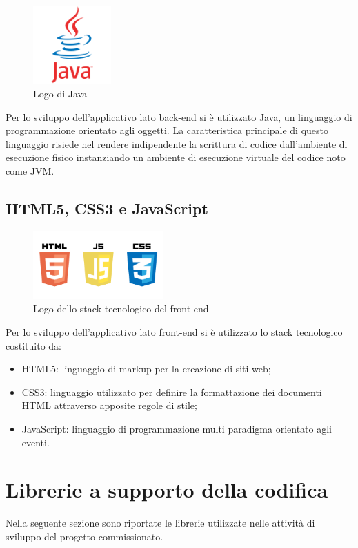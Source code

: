 \begin{figure}[!h]
	\centering
	\includegraphics[width=3cm]{../images/Java-logo.png}
	\caption{Logo di Java}
\end{figure}

\noindent Per lo sviluppo dell'applicativo lato back-end si è utilizzato Java, un linguaggio di programmazione orientato agli oggetti. La caratteristica principale di questo linguaggio risiede nel rendere indipendente la scrittura di codice dall'ambiente di esecuzione fisico instanziando un ambiente di esecuzione virtuale del codice noto come JVM.

\subsection{HTML5, CSS3 e JavaScript}

\begin{figure}[!h]
	\centering
	\includegraphics[width=5cm]{../images/HTML5-logo.png}
	\caption{Logo dello stack tecnologico del front-end}
\end{figure}

\noindent Per lo sviluppo dell'applicativo lato front-end si è utilizzato lo stack tecnologico costituito da:
\begin{itemize}
\item HTML5: linguaggio di markup per la creazione di siti web;
\item CSS3: linguaggio utilizzato per definire la formattazione dei documenti HTML attraverso apposite regole di stile;
\item JavaScript: linguaggio di programmazione multi paradigma orientato agli eventi.
\end{itemize}

\pagebreak

\section{Librerie a supporto della codifica}
Nella seguente sezione sono riportate le librerie utilizzate nelle attività di sviluppo del progetto commissionato. 

